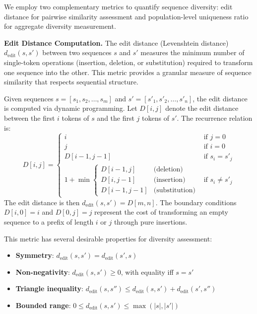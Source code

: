 \documentclass[conference]{IEEEtran}
\begin{document}
We employ two complementary metrics to quantify sequence diversity: edit distance for pairwise similarity assessment and population-level uniqueness ratio for aggregate diversity measurement.

\textbf{Edit Distance Computation.} The edit distance (Levenshtein distance) $d_{\text{edit}}(s, s')$ between two sequences $s$ and $s'$ measures the minimum number of single-token operations (insertion, deletion, or substitution) required to transform one sequence into the other. This metric provides a granular measure of sequence similarity that respects sequential structure.

Given sequences $s = [s_1, s_2, \ldots, s_m]$ and $s' = [s'_1, s'_2, \ldots, s'_n]$, the edit distance is computed via dynamic programming. Let $D[i,j]$ denote the edit distance between the first $i$ tokens of $s$ and the first $j$ tokens of $s'$. The recurrence relation is:
%
\begin{equation}
D[i,j] = \begin{cases}
i & \text{if } j = 0 \\
j & \text{if } i = 0 \\
D[i-1,j-1] & \text{if } s_i = s'_j \\
1 + \min\begin{cases}
D[i-1,j] & \text{(deletion)} \\
D[i,j-1] & \text{(insertion)} \\
D[i-1,j-1] & \text{(substitution)}
\end{cases} & \text{if } s_i \neq s'_j
\end{cases}
\end{equation}
%
The edit distance is then $d_{\text{edit}}(s, s') = D[m,n]$. The boundary conditions $D[i,0] = i$ and $D[0,j] = j$ represent the cost of transforming an empty sequence to a prefix of length $i$ or $j$ through pure insertions.

This metric has several desirable properties for diversity assessment:
\begin{itemize}
    \item \textbf{Symmetry}: $d_{\text{edit}}(s, s') = d_{\text{edit}}(s', s)$
    \item \textbf{Non-negativity}: $d_{\text{edit}}(s, s') \geq 0$, with equality iff $s = s'$
    \item \textbf{Triangle inequality}: $d_{\text{edit}}(s, s'') \leq d_{\text{edit}}(s, s') + d_{\text{edit}}(s', s'')$
    \item \textbf{Bounded range}: $0 \leq d_{\text{edit}}(s, s') \leq \max(|s|, |s'|)$
\end{itemize}
\end{document}
